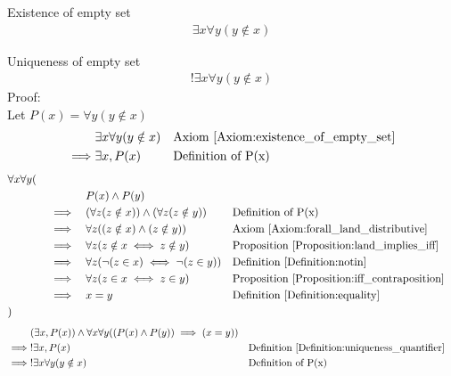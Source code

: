 \begin{axm}
\label{Axiom:existence_of_empty_set}
Existence of empty set
\begin{align*}
\exists x \forall y (y \notin x)
\end{align*}
\end{axm}

\begin{prop}
\label{Proposition:uniqueness_of_empty_set}
Uniqueness of empty set
\begin{align*}
!\exists x \forall y (y \notin x)
\end{align*}
Proof: \\
Let $P(x) = \forall y (y \notin x)$
\begin{align*}
& \exists x \forall y (y \notin x) && \text{Axiom \ref{Axiom:existence_of_empty_set}} \\
\implies & \exists x, P(x) && \text{Definition of P(x)}
\end{align*}
\begin{align*}
& \forall x \forall y ( \\
& \quad && &&  P(x) \land P(y) \\
& \quad && \implies &&  (\forall z (z \notin x)) \land (\forall z (z \notin y))
&& \text{Definition of P(x)} \\
& \quad && \implies && \forall z ((z \notin x) \land (z \notin y))
&& \text{Axiom \ref{Axiom:forall_land_distributive}} \\
& \quad && \implies && \forall z (z \notin x \iff z \notin y)
&& \text{Proposition \ref{Proposition:land_implies_iff}} \\
& \quad && \implies && \forall z (\lnot(z \in x) \iff \lnot (z \in y))
&& \text{Definition \ref{Definition:notin}} \\
& \quad && \implies && \forall z (z \in x \iff z \in y)
&& \text{Proposition \ref{Proposition:iff_contraposition}} \\
& \quad && \implies && x = y
&& \text{Definition \ref{Definition:equality}} \\
& )
\end{align*}
\begin{align*}
& (\exists x, P(x)) \land \forall x \forall y ( (P(x) \land P(y)) \implies (x=y) ) \\
\implies & !\exists x, P(x) && \text{Definition \ref{Definition:uniqueness_quantifier}} \\
\implies & !\exists x \forall y (y \notin x) && \text{Definition of P(x)} \\
\end{align*}
\end{prop}
